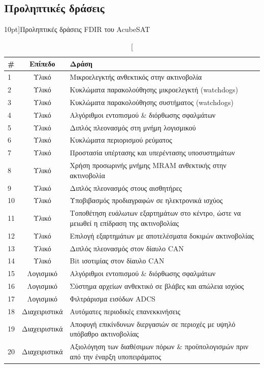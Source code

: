 \documentclass[a4paper,nobib]{tufte-book}
\begin{document}
\clearpage
\subsection{Προληπτικές δράσεις}

\begin{table}[h]
	\centering
	\caption[][10pt]{Προληπτικές δράσεις \acs{FDIR} του AcubeSAT}
	\label{tab:fdir_preventive}
	\renewcommand{\arraystretch}{1.5}
	\begin{tabularx}{\textwidth}{@{}lcX@{}}
		\toprule
		\# & Επίπεδο & Δράση \\ \midrule
		1 & Υλικό & Μικροελεγκτής ανθεκτικός στην ακτινοβολία \\
		2 & Υλικό & Κυκλώματα παρακολούθησης μικροελεγκτή (watchdogs) \\
		3 & Υλικό & Κυκλώματα παρακολούθησης συστήματος (watchdogs) \\
		4 & Υλικό & Αλγόριθμοι εντοπισμού \& διόρθωσης σφαλμάτων \\
		5 & Υλικό & Διπλός πλεονασμός στη μνήμη λογισμικού \\
		6 & Υλικό & Κυκλώματα περιορισμού ρεύματος \\
		7 & Υλικό & Προστασία υπέρτασης και υπερέντασης υποσυστημάτων \\
		8 & Υλικό & Χρήση προσωρινής μνήμης \acs{MRAM} ανθεκτικής στην ακτινοβολία \\
		9 & Υλικό & Διπλός πλεονασμός στους αισθητήρες \\
		10 & Υλικό & Υποβιβασμός προδιαγραφών σε ηλεκτρονικά ισχύος \\
		11 & Υλικό & Τοποθέτηση ευάλωτων εξαρτημάτων στο κέντρο, ώστε να μειωθεί η επίδραση της ακτινοβολίας \\
		12 & Υλικό & Επιλογή εξαρτημάτων με αποτελέσματα δοκιμών ακτινοβολίας \\
		13 & Υλικό & Διπλός πλεονασμός στον δίαυλο \acs{CAN} \\
		14 & Υλικό & Bit ισοτιμίας στον δίαυλο \acs{CAN} \\
		15 & Λογισμικό & Αλγόριθμοι εντοπισμού \& διόρθωσης σφαλμάτων \\
		16 & Λογισμικό & Σύστημα αρχείων ανθεκτικό σε βλάβες και απώλεια ισχύος \\
		17 & Λογισμικό & Φιλτράρισμα εισόδων \acs{ADCS} \\
		18 & Διαχειριστικά & Αυτόματες περιοδικές επανεκκινήσεις \\
		19 & Διαχειριστικά & Αποφυγή επικίνδυνων διεργασιών σε περιοχές με υψηλό υπόβαθρο ακτινοβολίας \\
		20 & Διαχειριστικά & Αξιολόγηση των διαθέσιμων πόρων \& προϋπολογισμών πριν από την έναρξη υποπειράματος \\ \bottomrule
	\end{tabularx}
\end{table}
\end{document}
